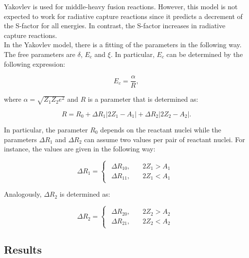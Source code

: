 \documentclass[openany]{book}
\begin{document}
Yakovlev is used for middle-heavy fusion reactions. However, this model is not expected to work for radiative capture reactions since it predicts a decrement of the S-factor for all energies. In contrast, the S-factor increases in radiative capture reactions.  \\

In the Yakovlev model, there is a fitting of the parameters in the following way.  The free parameters are $\delta$, $E_c$ and $\xi$. In particular, $E_c$ can be determined by the following expression:

\begin{equation}
	E_c = \frac{\alpha}{R},
\end{equation}

where $\alpha = \sqrt{Z_1Z_2e^2}$ and $R$ is a parameter that is determined as:

\begin{equation}
	R = R_0 + \Delta R_{1} |2Z_1 - A_1| + \Delta R_{2}|2Z_2 - A_2|.
\end{equation}

In particular, the parameter $R_0$ depends on the reactant nuclei while the parameters $\Delta R_{1}$ and $\Delta R_{2}$ can assume two values per pair of reactant nuclei. For instance, the values are given in the following way: 

\begin{equation}
	\Delta R_1= 	\left\{\begin{array}{l}
		\begin{split}
			\Delta R_{10}, \quad & 2Z_1 > A_1\\ 
			\Delta R_{11}, \quad & 2Z_1 < A_1
		\end{split}
	\end{array}\right.
\end{equation}

Analogously, $\Delta R_2$ is determined as: 

\begin{equation}
	\Delta R_2= 	\left\{\begin{array}{l}
		\begin{split}
			\Delta R_{20}, \quad & 2Z_2 > A_2\\ 
			\Delta R_{21}, \quad & 2Z_2 < A_2
		\end{split}
	\end{array}\right.
\end{equation}

\subsection{Results}
\end{document}
